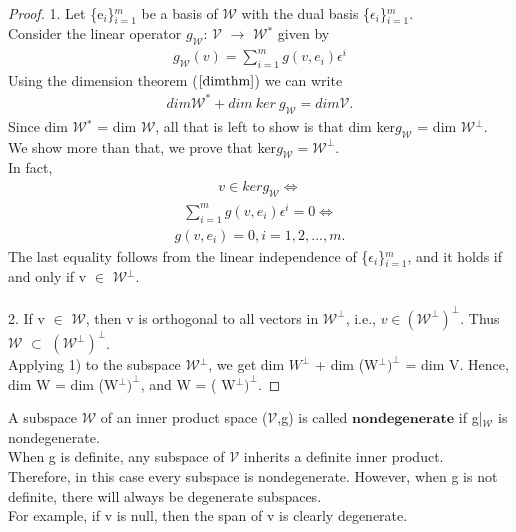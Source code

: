 \documentclass[12pt,a4paper]{article}
\begin{document}
\begin{proof}
1. Let \{e$_i$\}$^m_{i=1}$  be a basis of $\mathcal{W}$ with the dual basis \{$\epsilon$$_i$\}$^m_{i=1}$. \\Consider the linear operator $g_\mathcal{W}$: $\mathcal{V}$ $\to$ $\mathcal{W}$$^*$ given by
\begin{align*}
g_\mathcal{W}(v) = \sum_{i=1}^{m} g(v, e_i)\epsilon^i
\end{align*}
 Using the dimension theorem ($\ref{dimthm}$) we can write
 \begin{align*}
dim \mathcal{W}^* + dim \ ker \ g_\mathcal{W} = dim \mathcal{V}.
\end{align*}
Since dim $\mathcal{W}$$^*$ = dim $\mathcal{W}$, all that is left to show is that dim ker$g_\mathcal{W}$ = dim $\mathcal{W}$$^\perp$. \\We show more than that, we prove that ker$g_\mathcal{W} = \mathcal{W}^\perp$. \\In fact,\\
\begin{align*}
v \in ker g_\mathcal{W} \Leftrightarrow
\end{align*}
\begin{align*}
 \sum^m_{i=1} g(v, e_i) \epsilon^i = 0 \Leftrightarrow
 \end{align*}
\begin{align*}
g(v, e_i) = 0, i = 1, 2, ... , m.
\end{align*}
The last equality follows from the linear independence of  \{$\epsilon$$_i$\}$^m_{i=1}$, and it holds if and only if v $\in$ $\mathcal{W}$$^\perp$.\\\\
2. If v $\in$ $\mathcal{W}$, then v is orthogonal to all vectors in $\mathcal{W}^\perp$, i.e., $v \in (\mathcal{W}^\perp)^\perp$. Thus $\mathcal{W}$ $\subset$ $(\mathcal{W}^\perp)^\perp$. \\
Applying 1) to the subspace
$\mathcal{W}$$^\perp$, we get dim $W^\perp$ + dim (W$^\perp)^\perp$ = dim V. Hence, dim W = dim (W$^\perp)^\perp$, and W = ( W$^\perp)^\perp$.
\end{proof}
A subspace $\mathcal{W}$ of an inner product space ($\mathcal{V}$,g) is called $\textbf{nondegenerate}$ if g|$_\mathcal{W}$ is nondegenerate. \\When g is definite, any subspace of $\mathcal{V}$ inherits
a definite inner product. \\Therefore, in this case every subspace is nondegenerate. However, when g is not definite, there will always be degenerate
subspaces.\\ For example, if v is null, then the span of v is clearly degenerate.
\end{document}
